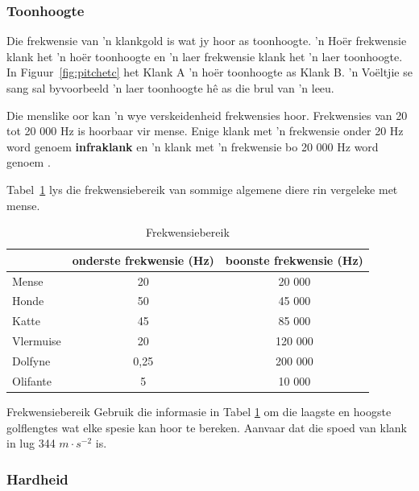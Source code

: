             \subsubsection{Toonhoogte}
            \nopagebreak
            
Die frekwensie van  'n klankgold is wat jy hoor as toonhoogte.  'n Ho\"er frekwensie klank het  'n ho\"er toonhoogte en  'n laer frekwensie klank het  'n laer toonhoogte. In Figuur~\ref{fig:pitchetc} het Klank A  'n ho\"er toonhoogte as Klank B.  'n Vo\"eltjie se sang sal byvoorbeeld  'n laer toonhoogte h\^e as die brul van  'n leeu.\par

Die menslike oor kan  'n wye verskeidenheid frekwensies hoor. Frekwensies van 20 tot 20 000 Hz is hoorbaar vir mense. Enige klank met  'n frekwensie onder 20 Hz word genoem \textbf{infraklank} en  'n klank met  'n frekwensie bo 20 000 Hz word genoem .\par


Tabel~\ref{p:wsl:s11:rangeoff} lys die frekwensiebereik van sommige algemene diere rin vergeleke met mense.

\begin{table}[htbp]
\begin{center}
\caption{Frekwensiebereik}
\label{p:wsl:s11:rangeoff}
\begin{tabular}{|l|c|c|}\hline
&onderste frekwensie (Hz) & boonste frekwensie (Hz)\\\hline\hline
Mense & 20 & 20 000\\\hline
Honde & 50 & 45 000\\\hline
Katte & 45 & 85 000\\\hline
Vlermuise & 20 & 120 000\\\hline
Dolfyne & 0,25 & 200 000\\\hline
Olifante & 5 & 10 000\\\hline
\hline
\end{tabular}
\end{center}
\end{table}
    \par
\begin{activity}{Frekwensiebereik}
\nopagebreak
Gebruik die informasie in Tabel \ref{p:wsl:s11:rangeoff} om die laagste en hoogste golflengtes wat elke spesie kan hoor te bereken. Aanvaar dat die spoed van klank in lug 344 $m \cdot s^{-2}$ is.
\end{activity}
 
\subsubsection{Hardheid}
\nopagebreak

